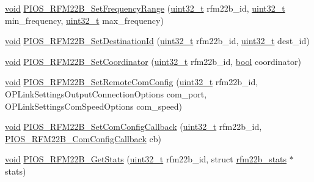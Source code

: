\begin{DoxyCompactItemize}
\item 
\hyperlink{group___n_a_m_e_ga18028b8badbf1ea7e704ccac3c488e82}{void} \hyperlink{group___p_i_o_s___r_f_m22_b_ga6b7275549a5178f70500c1705d85e30a}{P\-I\-O\-S\-\_\-\-R\-F\-M22\-B\-\_\-\-Set\-Frequency\-Range} (\hyperlink{stdint_8h_a435d1572bf3f880d55459d9805097f62}{uint32\-\_\-t} rfm22b\-\_\-id, \hyperlink{stdint_8h_a435d1572bf3f880d55459d9805097f62}{uint32\-\_\-t} min\-\_\-frequency, \hyperlink{stdint_8h_a435d1572bf3f880d55459d9805097f62}{uint32\-\_\-t} max\-\_\-frequency)
\item 
\hyperlink{group___n_a_m_e_ga18028b8badbf1ea7e704ccac3c488e82}{void} \hyperlink{group___p_i_o_s___r_f_m22_b_ga2e2954db8900f7f997170fbc5047e748}{P\-I\-O\-S\-\_\-\-R\-F\-M22\-B\-\_\-\-Set\-Destination\-Id} (\hyperlink{stdint_8h_a435d1572bf3f880d55459d9805097f62}{uint32\-\_\-t} rfm22b\-\_\-id, \hyperlink{stdint_8h_a435d1572bf3f880d55459d9805097f62}{uint32\-\_\-t} dest\-\_\-id)
\item 
\hyperlink{group___n_a_m_e_ga18028b8badbf1ea7e704ccac3c488e82}{void} \hyperlink{group___p_i_o_s___r_f_m22_b_gaf27178ba026097c91627b50f862f388e}{P\-I\-O\-S\-\_\-\-R\-F\-M22\-B\-\_\-\-Set\-Coordinator} (\hyperlink{stdint_8h_a435d1572bf3f880d55459d9805097f62}{uint32\-\_\-t} rfm22b\-\_\-id, \hyperlink{group___exported__types_gaf6a258d8f3ee5206d682d799316314b1}{bool} coordinator)
\item 
\hyperlink{group___n_a_m_e_ga18028b8badbf1ea7e704ccac3c488e82}{void} \hyperlink{group___p_i_o_s___r_f_m22_b_ga74f4ab9cf6b2337fc517addf32e432d7}{P\-I\-O\-S\-\_\-\-R\-F\-M22\-B\-\_\-\-Set\-Remote\-Com\-Config} (\hyperlink{stdint_8h_a435d1572bf3f880d55459d9805097f62}{uint32\-\_\-t} rfm22b\-\_\-id, O\-P\-Link\-Settings\-Output\-Connection\-Options com\-\_\-port, O\-P\-Link\-Settings\-Com\-Speed\-Options com\-\_\-speed)
\item 
\hyperlink{group___n_a_m_e_ga18028b8badbf1ea7e704ccac3c488e82}{void} \hyperlink{group___p_i_o_s___r_f_m22_b_gaa2f467cefea23fca9354817c336c2c7f}{P\-I\-O\-S\-\_\-\-R\-F\-M22\-B\-\_\-\-Set\-Com\-Config\-Callback} (\hyperlink{stdint_8h_a435d1572bf3f880d55459d9805097f62}{uint32\-\_\-t} rfm22b\-\_\-id, \hyperlink{group___p_i_o_s___r_f_m22_b_gaa8a316480e010f5e383d29257c0686cd}{P\-I\-O\-S\-\_\-\-R\-F\-M22\-B\-\_\-\-Com\-Config\-Callback} cb)
\item 
\hyperlink{group___n_a_m_e_ga18028b8badbf1ea7e704ccac3c488e82}{void} \hyperlink{group___p_i_o_s___r_f_m22_b_ga7993764aede415744ac90bf71b2a84f5}{P\-I\-O\-S\-\_\-\-R\-F\-M22\-B\-\_\-\-Get\-Stats} (\hyperlink{stdint_8h_a435d1572bf3f880d55459d9805097f62}{uint32\-\_\-t} rfm22b\-\_\-id, struct \hyperlink{structrfm22b__stats}{rfm22b\-\_\-stats} $\ast$stats)

\end{DoxyCompactItemize}
